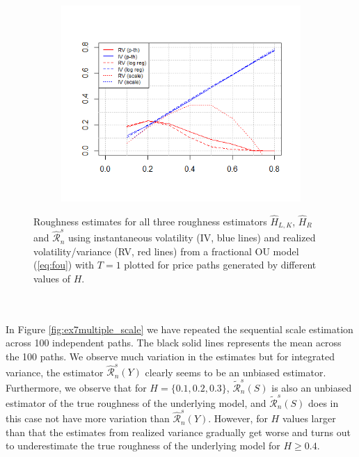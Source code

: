 \documentclass{article}
\begin{document}
\begin{figure}[htbp]
    \centering
    
    \begin{subfigure}{0.78\textwidth}
        \includegraphics[width=\linewidth]{ex7_scale_single.png}
    \end{subfigure}
    
    \caption{Roughness estimates for all three roughness estimators $\widehat{H}_{L,K}$, $\widehat{H}_R$ and $\widehat{\mathscr{R}}_n^s$ using instantaneous volatility (IV, blue lines) and realized volatility/variance (RV, red lines) from a fractional OU model (\ref{eq:fou}) with $T=1$ plotted for price paths generated by different values of $H$.}
    \label{fig:ex7singleincl_scale}
\end{figure}\\\\
In Figure \ref{fig:ex7multiple_scale} we have repeated the sequential scale estimation across 100 independent paths. The black solid lines represents the mean across the 100 paths. We observe much variation in the estimates but for integrated variance, the estimator $\widehat{\mathscr{R}}_n^s (Y)$ clearly seems to be an unbiased estimator. Furthermore, we observe that for $H=\{0.1,0.2,0.3\}$, $\widetilde{\mathscr{R}}_n^s (S)$ is also an unbiased estimator of the true roughness of the underlying model, and $\widetilde{\mathscr{R}}_n^s (S)$ does in this case not have more variation than  $\widehat{\mathscr{R}}_n^s (Y)$. However, for $H$ values larger than that the estimates from realized variance gradually get worse and turns out to underestimate the true roughness of the underlying model for $H\geq 0.4$. \\
\end{document}
